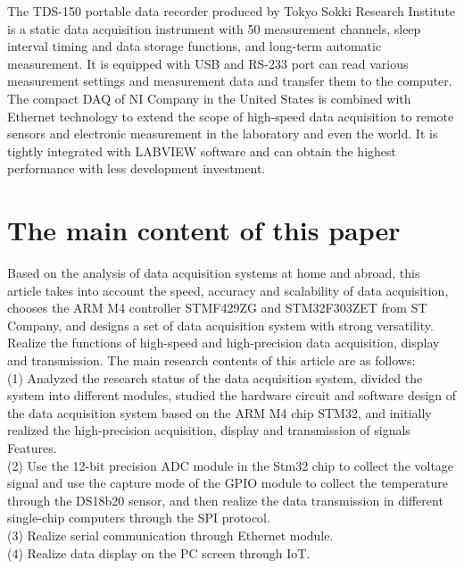 The TDS-150 portable data recorder produced by Tokyo Sokki Research Institute is a static data acquisition instrument with 50 measurement channels, sleep interval timing and data storage functions, and long-term automatic measurement. It is equipped with USB and RS-233 port can read various measurement settings and measurement data and transfer them to the computer. The compact DAQ of NI Company in the United States is combined with Ethernet technology to extend the scope of high-speed data acquisition to remote sensors and electronic measurement in the laboratory and even the world. It is tightly integrated with LABVIEW software and can obtain the highest performance with less development investment.

\section{The main content of this paper}
\label{The main content of this paper}
Based on the analysis of data acquisition systems at home and abroad, this article takes into account the speed, accuracy and scalability of data acquisition, chooses the ARM M4 controller STMF429ZG and STM32F303ZET from ST Company, and designs a set of data acquisition system with strong versatility. Realize the functions of high-speed and high-precision data acquisition, display and transmission. The main research contents of this article are as follows:
\\
(1) Analyzed the research status of the data acquisition system, divided the system into different modules, studied the hardware circuit and software design of the data acquisition system based on the ARM M4 chip STM32, and initially realized the high-precision acquisition, display and transmission of signals Features.
\\
(2) Use the 12-bit precision ADC module in the Stm32 chip to collect the voltage signal and use the capture mode of the GPIO module to collect the temperature through the DS18b20 sensor, and then realize the data transmission in different single-chip computers through the SPI protocol.
\\
(3) Realize serial communication through Ethernet module.
\\
(4) Realize data display on the PC screen through IoT.
 




